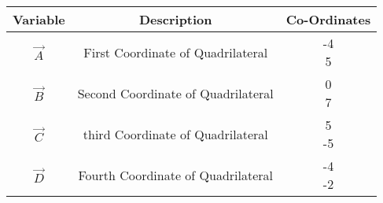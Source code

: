 \begin{center}
    \begin{tabular}{|c|c|c|} 
        \hline
            \textbf{Variable} & \textbf{Description} & \textbf{Co-Ordinates} \\ 
        \hline
	    $\vec{A}$    & First Coordinate of Quadrilateral & \myvec{-4\\ 5} \\ 
        \hline
	    $\vec{B}$    & Second Coordinate of Quadrilateral  & \myvec{0\\7}\\ 
        \hline
	    $\vec{C}$    & third Coordinate of Quadrilateral  & \myvec{5\\-5}\\
            \hline
	    $\vec{D}$&  Fourth Coordinate of Quadrilateral  & \myvec{-4 \\ -2}\\
        \hline
    \end{tabular}
\end{center}

